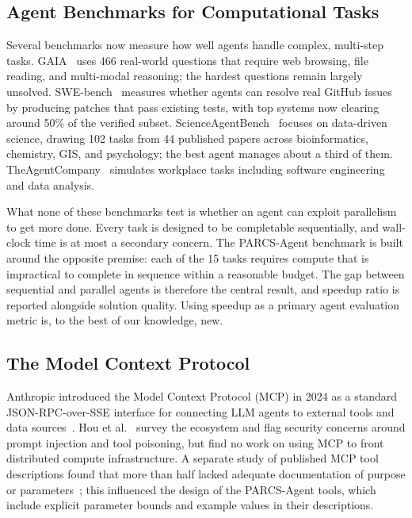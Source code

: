 \documentclass[preprints,article,submit,pdftex,moreauthors]{Definitions/mdpi}
\begin{document}
\subsection{Agent Benchmarks for Computational Tasks}

Several benchmarks now measure how well agents handle complex, multi-step tasks. GAIA~\citep{ref-gaia} uses 466 real-world questions that require web browsing, file reading, and multi-modal reasoning; the hardest questions remain largely unsolved. SWE-bench~\citep{ref-swebench} measures whether agents can resolve real GitHub issues by producing patches that pass existing tests, with top systems now clearing around 50\% of the verified subset. ScienceAgentBench~\citep{ref-sciagentbench} focuses on data-driven science, drawing 102 tasks from 44 published papers across bioinformatics, chemistry, GIS, and psychology; the best agent manages about a third of them. TheAgentCompany~\citep{ref-agentcompany} simulates workplace tasks including software engineering and data analysis.

What none of these benchmarks test is whether an agent can exploit parallelism to get more done. Every task is designed to be completable sequentially, and wall-clock time is at most a secondary concern. The PARCS-Agent benchmark is built around the opposite premise: each of the 15 tasks requires compute that is impractical to complete in sequence within a reasonable budget. The gap between sequential and parallel agents is therefore the central result, and speedup ratio is reported alongside solution quality. Using speedup as a primary agent evaluation metric is, to the best of our knowledge, new.

\subsection{The Model Context Protocol}

Anthropic introduced the Model Context Protocol (MCP) in 2024 as a standard JSON-RPC-over-SSE interface for connecting LLM agents to external tools and data sources~\citep{ref-mcp}. Hou et al.~\citep{ref-mcpsurvey} survey the ecosystem and flag security concerns around prompt injection and tool poisoning, but find no work on using MCP to front distributed compute infrastructure. A separate study of published MCP tool descriptions found that more than half lacked adequate documentation of purpose or parameters~\citep{ref-mcpsmell}; this influenced the design of the PARCS-Agent tools, which include explicit parameter bounds and example values in their descriptions.
\end{document}
